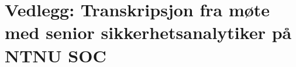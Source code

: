 \chapter{Vedlegg: Transkripsjon fra møte med senior sikkerhetsanalytiker på NTNU SOC}

\label{transkripsjon}